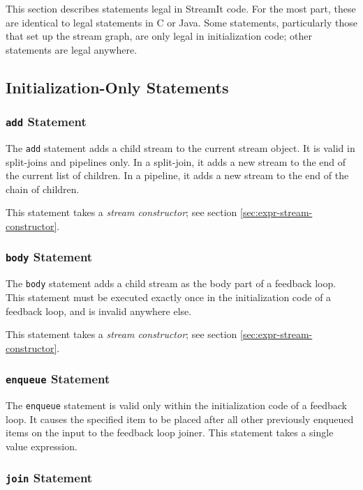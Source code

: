 \documentclass[11pt]{article}
\begin{document}
This section describes statements legal in StreamIt code.  For the
most part, these are identical to legal statements in C or Java.  Some
statements, particularly those that set up the stream graph, are only
legal in initialization code; other statements are legal anywhere.

\subsection{Initialization-Only Statements}

\subsubsection{\lstinline|add| Statement}

The \lstinline|add| statement adds a child stream to the current stream
object.  It is valid in split-joins and pipelines only.  In a
split-join, it adds a new stream to the end of the current list of
children.  In a pipeline, it adds a new stream to the end of the chain
of children.

This statement takes a \emph{stream constructor}; see section
\ref{sec:expr-stream-constructor}.

\subsubsection{\lstinline|body| Statement}

The \lstinline|body| statement adds a child stream as the body part of
a feedback loop.  This statement must be executed exactly once in the
initialization code of a feedback loop, and is invalid anywhere else.

This statement takes a \emph{stream constructor}; see section
\ref{sec:expr-stream-constructor}.

\subsubsection{\lstinline|enqueue| Statement}

The \lstinline|enqueue| statement is valid only within the
initialization code of a feedback loop.  It causes the specified item
to be placed after all other previously enqueued items on the input to
the feedback loop joiner.  This statement takes a single value
expression.

\subsubsection{\lstinline|join| Statement}
\end{document}
